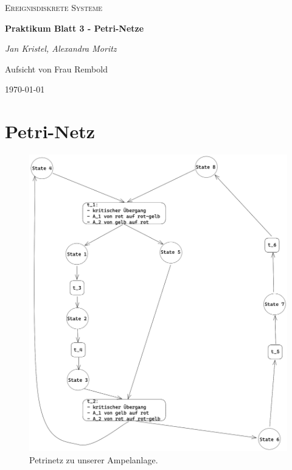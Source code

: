 \documentclass{article}
\begin{document}
		\begin{titlepage}
		\centering
		{\scshape\LARGE
			Ereignisdiskrete Systeme
			\par}
		\vspace{1.5cm}
		{\huge\bfseries Praktikum Blatt 3 - Petri-Netze\par}
		\vspace{1.5cm}
		{\LARGE\itshape Jan Kristel, Alexandra Moritz\par}
		\vfill
			Aufsicht von Frau Rembold\par
			
		\vfill	
			{\large \today \par}	
		
	\end{titlepage}
	
	\tableofcontents
	\newpage
	
	\section{Petri-Netz}
		\begin{figure}[h]
			\includegraphics[scale=0.14, left ,height=0.51\paperheight ,width=\paperwidth]{Petrinetz.png}
			\caption{Petrinetz zu unserer Ampelanlage.}
			\label{fig_1: Petrinetz}
		\end{figure}
\newpage
\end{document}
